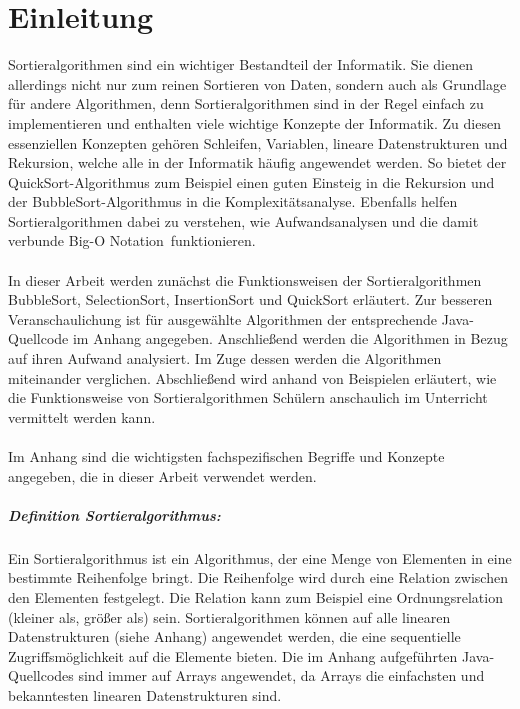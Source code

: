 \documentclass[./entry.tex]{subfiles}
\begin{document}
    \chapter{Einleitung}

    Sortieralgorithmen sind ein wichtiger Bestandteil der Informatik.
    Sie dienen allerdings nicht nur zum reinen Sortieren von Daten,
    sondern auch als Grundlage für andere Algorithmen,
    denn Sortieralgorithmen sind in der Regel einfach zu implementieren
    und enthalten viele wichtige Konzepte der Informatik.
    Zu diesen essenziellen Konzepten gehören Schleifen,
    Variablen, lineare Datenstrukturen und Rekursion, welche
    alle in der Informatik häufig angewendet werden.
    So bietet der QuickSort-Algorithmus zum Beispiel einen guten Einsteig in die Rekursion
    und der BubbleSort-Algorithmus in die Komplexitätsanalyse.
    Ebenfalls helfen Sortieralgorithmen dabei zu verstehen,
    wie Aufwandsanalysen und die damit verbunde \dq Big-O Notation\dq\ funktionieren.
    \\\\
    In dieser Arbeit werden zunächst die Funktionsweisen der Sortieralgorithmen
    BubbleSort, SelectionSort, InsertionSort und QuickSort erläutert.
    Zur besseren Veranschaulichung ist für ausgewählte Algorithmen der entsprechende Java-Quellcode im Anhang angegeben.
    Anschließend werden die Algorithmen in Bezug auf ihren Aufwand analysiert.
    Im Zuge dessen werden die Algorithmen miteinander verglichen.
    Abschließend wird anhand von Beispielen erläutert, wie die Funktionsweise
    von Sortieralgorithmen Schülern anschaulich im Unterricht vermittelt werden kann.
    \\\\
    Im Anhang sind die wichtigsten fachspezifischen Begriffe und Konzepte
    angegeben, die in dieser Arbeit verwendet werden. \\

    \paragraph{Definition Sortieralgorithmus:}
    Ein Sortieralgorithmus ist ein Algorithmus, der eine Menge von Elementen in eine bestimmte Reihenfolge bringt.
    Die Reihenfolge wird durch eine Relation zwischen den Elementen festgelegt.
    Die Relation kann zum Beispiel eine Ordnungsrelation (kleiner als, größer als) sein.
    Sortieralgorithmen können auf alle linearen Datenstrukturen (siehe Anhang) angewendet werden,
    die eine sequentielle Zugriffsmöglichkeit auf die Elemente bieten.
    Die im Anhang aufgeführten Java-Quellcodes sind immer auf Arrays angewendet,
    da Arrays die einfachsten und bekanntesten linearen Datenstrukturen sind.
\end{document}
